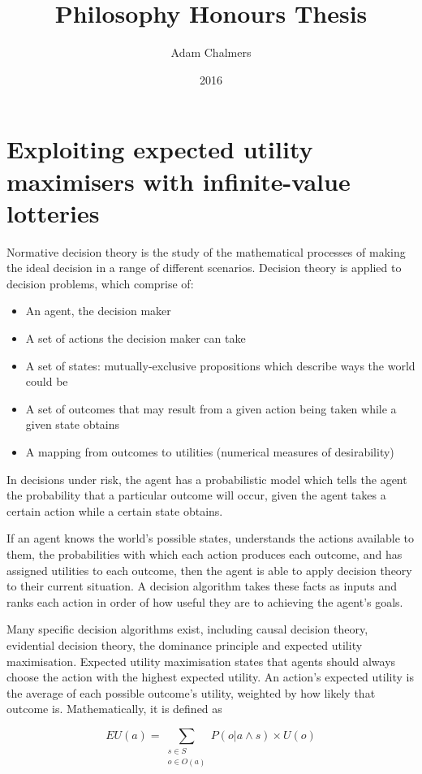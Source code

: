 \documentclass{article}
\title{Philosophy Honours Thesis}
\author{Adam Chalmers}
\date{2016}
\begin{document}
\maketitle

\section{Exploiting expected utility maximisers with infinite-value lotteries}
Normative decision theory is the study of the mathematical processes of making the ideal decision in a range of different scenarios. Decision theory is applied to decision problems, which comprise of:

\begin{itemize}  
\item An agent, the decision maker
\item A set of actions the decision maker can take
\item A set of states: mutually-exclusive propositions which describe ways the world could be
\item A set of outcomes that may result from a given action being taken while a given state obtains
\item A mapping from outcomes to utilities (numerical measures of desirability)
\end{itemize}

In decisions under risk, the agent has a probabilistic model which tells the agent the probability that a particular outcome will occur, given the agent takes a certain action while a certain state obtains.

If an agent knows the world's possible states, understands the actions available to them, the probabilities with which each action produces each outcome, and has assigned utilities to each outcome, then the agent is able to apply decision theory to their current situation. A decision algorithm takes these facts as inputs and ranks each action in order of how useful they are to achieving the agent's goals. 

Many specific decision algorithms exist, including causal decision theory, evidential decision theory, the dominance principle and expected utility maximisation. Expected utility maximisation states that agents should always choose the action with the highest expected utility. An action's expected utility is the average of each possible outcome's utility, weighted by how likely that outcome is. Mathematically, it is defined as

\[EU(a)=\sum_{\substack{s\in S \\ o \in O(a)}}P(o|a \wedge s)\times U(o)\]
\end{document}

